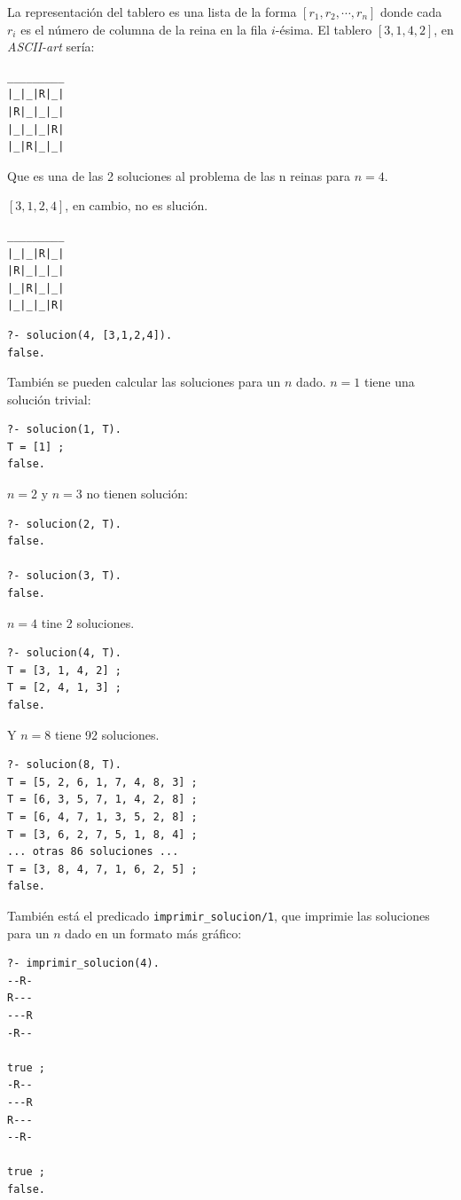 \documentclass[12pt,titlepage]{article}
\begin{document}
La representación del tablero es una lista de la forma $[r_1, r_2, \cdots, r_n]$ donde cada $r_i$ es el número de columna de la reina en la fila $i$-ésima. El tablero $[3,1,4,2]$, en \emph{ASCII-art} sería:
\begin{verbatim}
_________
|_|_|R|_|
|R|_|_|_|
|_|_|_|R|
|_|R|_|_|
\end{verbatim}

Que es una de las 2 soluciones al problema de las n reinas para $n=4$.

$[3,1,2,4]$, en cambio, no es slución.

\begin{verbatim}
_________
|_|_|R|_|
|R|_|_|_|
|_|R|_|_|
|_|_|_|R|
\end{verbatim}

\begin{lstlisting}
?- solucion(4, [3,1,2,4]).
false.
\end{lstlisting}

También se pueden calcular las soluciones para un $n$ dado. $n=1$ tiene una solución trivial:
\begin{lstlisting}
?- solucion(1, T).
T = [1] ;
false.
\end{lstlisting}

$n=2$ y $n=3$ no tienen solución:
\begin{lstlisting}
?- solucion(2, T).
false.

?- solucion(3, T).
false.
\end{lstlisting}

$n=4$ tine 2 soluciones.
\begin{lstlisting}
?- solucion(4, T).
T = [3, 1, 4, 2] ;
T = [2, 4, 1, 3] ;
false.
\end{lstlisting}

Y $n=8$ tiene 92 soluciones.
\begin{lstlisting}
?- solucion(8, T).
T = [5, 2, 6, 1, 7, 4, 8, 3] ;
T = [6, 3, 5, 7, 1, 4, 2, 8] ;
T = [6, 4, 7, 1, 3, 5, 2, 8] ;
T = [3, 6, 2, 7, 5, 1, 8, 4] ;
... otras 86 soluciones ...
T = [3, 8, 4, 7, 1, 6, 2, 5] ;
false.
\end{lstlisting}

También está el predicado \lstinline|imprimir_solucion/1|, que imprimie las soluciones para un $n$ dado en un formato más gráfico:
\begin{lstlisting}
?- imprimir_solucion(4).
--R-
R---
---R
-R--

true ;
-R--
---R
R---
--R-

true ;
false.
\end{lstlisting}
\end{document}
